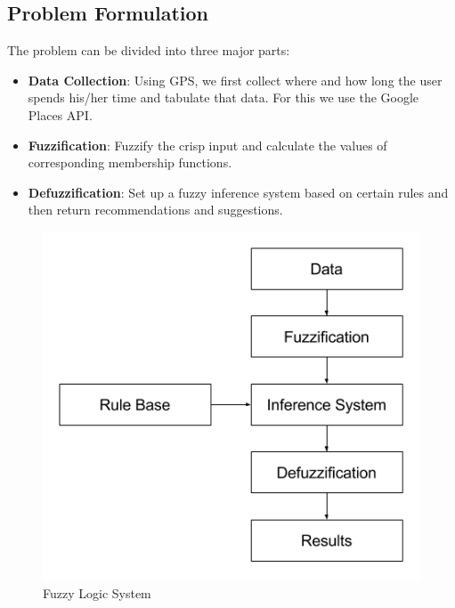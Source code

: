 \documentclass[conference]{IEEEtran}
\begin{document}
\subsection{Problem Formulation}

The problem can be divided into three major parts:

\begin{itemize}
\item \textbf{Data Collection}: Using GPS, we first collect where and how long the user spends his/her time and tabulate that data. For this we use the Google Places API.
\item \textbf{Fuzzification}: Fuzzify the crisp input and calculate the values of corresponding membership functions.
\item \textbf{Defuzzification}: Set up a fuzzy inference system based on certain rules and then return recommendations and suggestions.
\end{itemize}

\begin{figure}[h!]
\centering
\captionsetup{justification=centering}
\noindent \includegraphics[scale=0.6]{fig1}
\caption{Fuzzy Logic System}
\end{figure}

\end{document}
